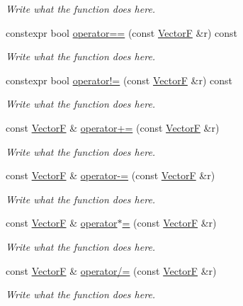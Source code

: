 \begin{DoxyCompactItemize}
\begin{DoxyCompactList}\small\item\em Write what the function does here. \end{DoxyCompactList}\item 
constexpr bool \hyperlink{structVectorF_a6ddfb24b4998b965c3f1348d6f15ee6f}{operator==} (const \hyperlink{structVectorF}{Vector\+F} \&r) const 
\begin{DoxyCompactList}\small\item\em Write what the function does here. \end{DoxyCompactList}\item 
constexpr bool \hyperlink{structVectorF_ae46d7475b96acfad53885c5b72621aa9}{operator!=} (const \hyperlink{structVectorF}{Vector\+F} \&r) const 
\begin{DoxyCompactList}\small\item\em Write what the function does here. \end{DoxyCompactList}\item 
const \hyperlink{structVectorF}{Vector\+F} \& \hyperlink{structVectorF_a767e52b421c36f5779d4eda65b965f4a}{operator+=} (const \hyperlink{structVectorF}{Vector\+F} \&r)
\begin{DoxyCompactList}\small\item\em Write what the function does here. \end{DoxyCompactList}\item 
const \hyperlink{structVectorF}{Vector\+F} \& \hyperlink{structVectorF_ad5ebdb98451cbc3d7c884cf3b89b963a}{operator-\/=} (const \hyperlink{structVectorF}{Vector\+F} \&r)
\begin{DoxyCompactList}\small\item\em Write what the function does here. \end{DoxyCompactList}\item 
const \hyperlink{structVectorF}{Vector\+F} \& \hyperlink{structVectorF_a88cf7042eb14233563d3019f2398bd32}{operator$\ast$=} (const \hyperlink{structVectorF}{Vector\+F} \&r)
\begin{DoxyCompactList}\small\item\em Write what the function does here. \end{DoxyCompactList}\item 
const \hyperlink{structVectorF}{Vector\+F} \& \hyperlink{structVectorF_af23ffd3fd18b6dde2eea6fdb17ad38af}{operator/=} (const \hyperlink{structVectorF}{Vector\+F} \&r)
\begin{DoxyCompactList}\small\item\em Write what the function does here. \end{DoxyCompactList}\item 

\end{DoxyCompactItemize}
